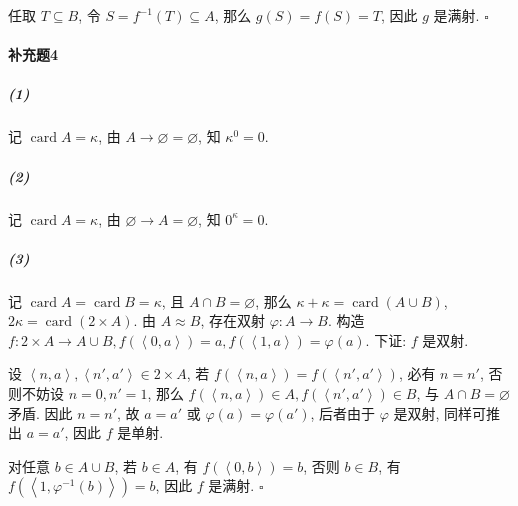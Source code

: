 \documentclass{ctexart}
\def\QED{\hfill $\square$}
\def\pair#1{\left\langle #1 \right\rangle}
\DeclareMathOperator{\card}{card}
\begin{document}
任取 $T\subseteq B$, 令 $S=f^{-1}(T) \subseteq A$, 那么 $g(S)=f(S)=T$,
因此 $g$ 是满射. \QED

\paragraph*{补充题4} 

\subparagraph*{(1)} 记 $\card A=\kappa$, 由 $A\to\varnothing=\varnothing$,
知 $\kappa^0=0$.

\subparagraph*{(2)} 记 $\card A=\kappa$, 由 $\varnothing\to A=\varnothing$,
知 $0^\kappa=0$.

\subparagraph*{(3)} 记 $\card A = \card B =\kappa$, 且 $A\cap B=\varnothing$,
那么 $\kappa+\kappa=\card(A\cup B)$, $2\kappa=\card(2\times A)$.
由 $A\approx B$, 存在双射 $\varphi: A\to B$.
构造 $f:2\times A \to A\cup B, f(\pair{0, a})=a, f(\pair{1, a})=\varphi(a)$.
下证: $f$ 是双射.

设 $\pair{n, a}, \pair{n',a'}\in 2\times A$, 若 $f(\pair{n, a})=f(\pair{n',a'})$,
必有 $n=n'$, 否则不妨设 $n=0, n'=1$, 那么 $f(\pair{n,a})\in A, f(\pair{n',a'})\in B$,
与 $A\cap B=\varnothing$ 矛盾. 因此 $n=n'$, 故 $a=a'$ 或 $\varphi(a)=\varphi(a')$,
后者由于 $\varphi$ 是双射, 同样可推出 $a=a'$, 因此 $f$ 是单射.

对任意 $b\in A\cup B$, 若 $b\in A$, 有 $f(\pair{0, b})=b$, 否则 $b\in B$,
有 $f(\pair{1, \varphi^{-1}(b)})=b$, 因此 $f$ 是满射. \QED


\end{document}
